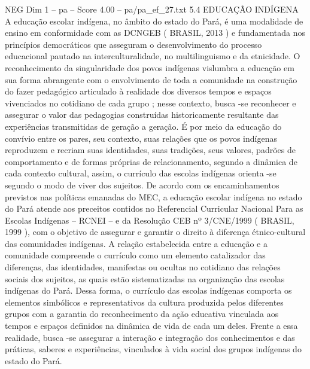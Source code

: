 \begin{textsample}{NEG Dim 1 – pa – Score 4.00 – pa/pa\_ef\_27.txt}  \label{ex:f1_neg_254}
5.4 EDUCAÇÃO INDÍGENA A educação escolar indígena, no âmbito do estado do Pará, é uma modalidade de ensino em conformidade com as DCNGEB ( BRASIL, 2013 ) e fundamentada nos princípios democráticos que asseguram o desenvolvimento do processo educacional pautado na interculturalidade, no multilinguismo e da etnicidade.
O reconhecimento da singularidade dos povos indígenas vislumbra a educação em sua forma abrangente com o envolvimento de toda a comunidade na construção do fazer pedagógico articulado à realidade dos diversos tempos e espaços vivenciados no cotidiano de cada grupo ; nesse contexto, busca -se reconhecer e assegurar o valor das pedagogias construídas historicamente resultante das experiências transmitidas de geração a geração.
É por meio da educação do convívio entre os pares, seu contexto, suas relações que os povos indígenas reproduzem e recriam suas identidades, suas tradições, seus valores, padrões de comportamento e de formas próprias de relacionamento, segundo a dinâmica de cada contexto cultural, assim, o currículo das escolas indígenas orienta -se segundo o modo de viver dos sujeitos.
De acordo com os encaminhamentos previstos nas políticas emanadas do MEC, a educação escolar indígena no estado do Pará atende aos preceitos contidos no Referencial Curricular Nacional Para as Escolas Indígenas – RCNEI – e da Resolução CEB nº 3/CNE/1999 ( BRASIL, 1999 ), com o objetivo de assegurar e garantir o direito à diferença étnico-cultural das comunidades indígenas.
A relação estabelecida entre a educação e a comunidade compreende o currículo como um elemento catalizador das diferenças, das identidades, manifestas ou ocultas no cotidiano das relações sociais dos sujeitos, as quais estão sistematizadas na organização das escolas indígenas do Pará.
Dessa forma, o currículo das escolas indígenas comporta os elementos simbólicos e representativos da cultura produzida pelos diferentes grupos com a garantia do reconhecimento da ação educativa vinculada aos tempos e espaços definidos na dinâmica de vida de cada um deles.
Frente a essa realidade, busca -se assegurar a interação e integração dos conhecimentos e das práticas, saberes e experiências, vinculados à vida social dos grupos indígenas do estado do Pará.

\end{textsample}
